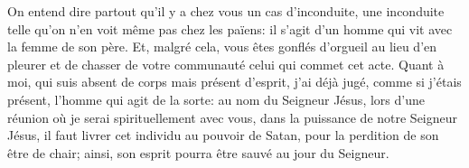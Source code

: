 On entend dire partout qu’il y a chez vous un cas d’inconduite,
	une inconduite telle qu’on n’en voit même pas chez les païens:
	il s’agit d’un homme qui vit avec la femme de son père.
Et, malgré cela, vous êtes gonflés d’orgueil au lieu d’en pleurer
	et de chasser de votre communauté celui qui commet cet acte.
Quant à moi, qui suis absent de corps mais présent d’esprit,
	j’ai déjà jugé, comme si j’étais présent, l’homme qui agit de la sorte:
	au nom du Seigneur Jésus,
		lors d’une réunion où je serai spirituellement avec vous,
	dans la puissance de notre Seigneur Jésus,
	il faut livrer cet individu au pouvoir de Satan,
	pour la perdition de son être de chair;
	ainsi, son esprit pourra être sauvé au jour du Seigneur.
